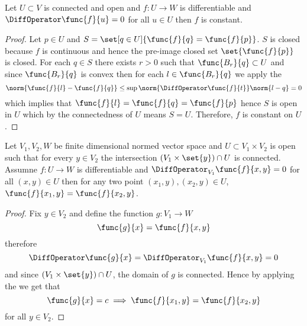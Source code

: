 \begin{corollary} \label{cr:derivativeZeroConstant}
    Let \(U \subset V\) is connected and open and \(f: U \to W\) is differentiable and \(\DiffOperator \func{f}{u} = 0\) for all \(u \in U\) then \(f\) is constant.
\end{corollary}

\begin{proof}
    Let \(p \in U\) and \( S = \set[q \in U]{\func{f}{q} = \func{f}{p}} \). \(S\) is closed because \(f\) is continuous and hence the pre-image closed set \(\set{\func{f}{p}}\) is closed. For each \(q \in S\) there exists \(r > 0\) such that \(\func{B_r}{q} \subset U\) and since \(\func{B_r}{q}\) is convex then for each \( l \in \func{B_r}{q}\) we apply the 
    \begin{equation*}
        \norm{\func{f}{l} - \func{f}{q}} \leq \sup \norm{\DiffOperator \func{f}{t}} \norm{l - q} = 0
    \end{equation*}
    which implies that \(\func{f}{l} = \func{f}{q} = \func{f}{p}\) hence \(S\) is open in \(U\) which by the connectedness of \(U\) means \(S = U\). Therefore, \(f\) is constant on \(U\).
\end{proof}

\begin{corollary}
    Let \(V_1, V_2, W\) be finite dimensional normed vector space and \(U \subset V_1 \times V_2\) is open such that for every \(y \in V_2\) the intersection \((V_1 \times \set{y}) \cap U\) is connected. Assumne \(f : U \to W\) is differentiable and \(\DiffOperator_{V_1} \func{f}{x,y} = 0\) for all \((x,y) \in U\) then for any two point \((x_1,y), (x_2,y) \in U\),\(\func{f}{x_1,y} = \func{f}{x_2,y}\).
\end{corollary}

\begin{proof}
    Fix \(y \in V_2\) and define the function \(g : V_1 \to W\)
    \begin{equation*}
        \func{g}{x} = \func{f}{x,y}
    \end{equation*}
    therefore
    \begin{equation*}
        \DiffOperator \func{g}{x} = \DiffOperator_{V_1} \func{f}{x,y} = 0
    \end{equation*}
    and since \((V_1 \times \set{y}) \cap U\), the domain of \(g\) is connected. Hence by applying the  we get that
    \begin{equation*}
        \func{g}{x} = c \implies \func{f}{x_1,y} = \func{f}{x_2,y}
    \end{equation*}
    for all \(y \in V_2\).
\end{proof}

